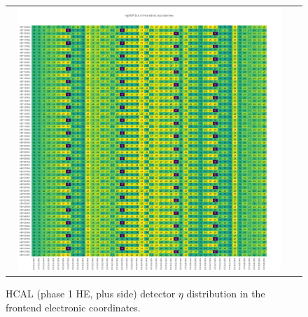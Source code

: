 \begin{figure}[htb]
 \begin{center}
  \begin{tabular}{cc}
   \includegraphics[angle=0,width=0.95\textwidth]{figures/appendix/ngHEP_Eta_in_FrontEnd.png}
  \end{tabular}
	\caption{HCAL (phase 1 HE, plus side) detector $\eta$ distribution in the frontend electronic coordinates.}
  \label{fig:lmapngHEPEtaFEC}
 \end{center}
\end{figure}
\clearpage

